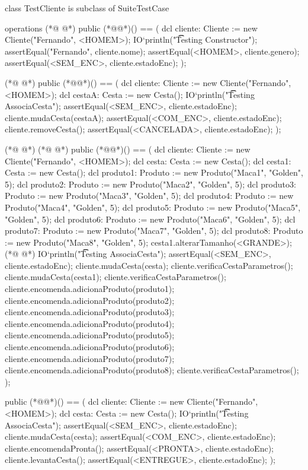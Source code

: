 \begin{vdmpp}[breaklines=true]
class TestCliente is subclass of SuiteTestCase

operations
(*@
\label{testConstructor:4}
@*)
  public (*@@*)() == (  
   dcl cliente: Cliente := new Cliente("Fernando", <HOMEM>);
    IO`println("\t\t Testing Constructor");
    assertEqual("Fernando", cliente.nome);
    assertEqual(<HOMEM>, cliente.genero);
    assertEqual(<SEM_ENC>, cliente.estadoEnc);
  );
  
(*@
\label{testMudaRemoveCesta:12}
@*)
  public (*@@*)() == (
   dcl cliente: Cliente := new Cliente("Fernando", <HOMEM>);
   dcl cestaA: Cesta := new Cesta();
   IO`println("\t\t Testing AssociaCesta");
   assertEqual(<SEM_ENC>, cliente.estadoEnc);
   cliente.mudaCesta(cestaA);
   assertEqual(<COM_ENC>, cliente.estadoEnc);
   cliente.removeCesta();
   assertEqual(<CANCELADA>, cliente.estadoEnc);
  );
  
(*@
\label{testUseCaseCesta:23}
@*)
(*@
\label{testVerificaEstadoEncomenda:23}
@*)
  public (*@@*)() == (
   dcl cliente: Cliente := new Cliente("Fernando", <HOMEM>);
   dcl cesta: Cesta := new Cesta();
   dcl cesta1: Cesta := new Cesta();
   dcl produto1: Produto := new Produto("Maca1", "Golden", 5);
   dcl produto2: Produto := new Produto("Maca2", "Golden", 5);
   dcl produto3: Produto := new Produto("Maca3", "Golden", 5);
   dcl produto4: Produto := new Produto("Maca4", "Golden", 5);
   dcl produto5: Produto := new Produto("Maca5", "Golden", 5);
   dcl produto6: Produto := new Produto("Maca6", "Golden", 5);
   dcl produto7: Produto := new Produto("Maca7", "Golden", 5);
   dcl produto8: Produto := new Produto("Maca8", "Golden", 5);
   cesta1.alterarTamanho(<GRANDE>);
(*@
\label{testAll:36}
@*)
   IO`println("\t\t Testing AssociaCesta");
   assertEqual(<SEM_ENC>, cliente.estadoEnc);
   cliente.mudaCesta(cesta);
   cliente.verificaCestaParametros();
   cliente.mudaCesta(cesta1); 
   cliente.verificaCestaParametros();
   cliente.encomenda.adicionaProduto(produto1);
   cliente.encomenda.adicionaProduto(produto2);
   cliente.encomenda.adicionaProduto(produto3);
   cliente.encomenda.adicionaProduto(produto4);
   cliente.encomenda.adicionaProduto(produto5);
   cliente.encomenda.adicionaProduto(produto6);
   cliente.encomenda.adicionaProduto(produto7);
   cliente.encomenda.adicionaProduto(produto8);
   cliente.verificaCestaParametros();
  );
    
  public (*@@*)() == (
   dcl cliente: Cliente := new Cliente("Fernando", <HOMEM>);
   dcl cesta: Cesta := new Cesta();
   IO`println("\t\t Testing AssociaCesta");
   assertEqual(<SEM_ENC>, cliente.estadoEnc);
   cliente.mudaCesta(cesta);
   assertEqual(<COM_ENC>, cliente.estadoEnc);   
   cliente.encomendaPronta();
   assertEqual(<PRONTA>, cliente.estadoEnc);
   cliente.levantaCesta();
   assertEqual(<ENTREGUE>, cliente.estadoEnc);   
  );


\end{vdmpp}
